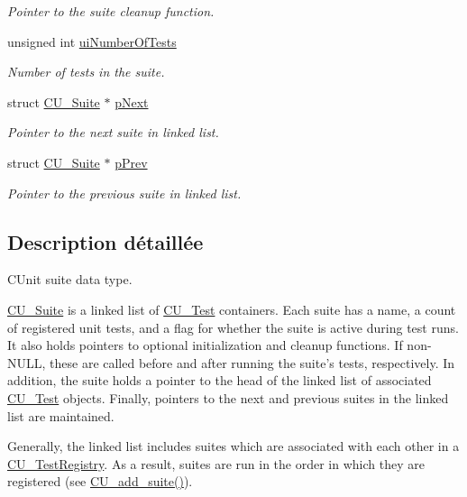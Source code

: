 \begin{DoxyCompactItemize}
\begin{DoxyCompactList}\small\item\em Pointer to the suite cleanup function. \end{DoxyCompactList}\item 
unsigned int \hyperlink{structCU__Suite_ac35747775ea5ffbb4cc1a2eb17dd1ca3}{ui\-Number\-Of\-Tests}
\begin{DoxyCompactList}\small\item\em Number of tests in the suite. \end{DoxyCompactList}\item 
struct \hyperlink{structCU__Suite}{C\-U\-\_\-\-Suite} $\ast$ \hyperlink{structCU__Suite_a695a5eb0087e2d64adc53da4518de69c}{p\-Next}
\begin{DoxyCompactList}\small\item\em Pointer to the next suite in linked list. \end{DoxyCompactList}\item 
struct \hyperlink{structCU__Suite}{C\-U\-\_\-\-Suite} $\ast$ \hyperlink{structCU__Suite_aa161293fb2ba337e52e1f6c9f5d68448}{p\-Prev}
\begin{DoxyCompactList}\small\item\em Pointer to the previous suite in linked list. \end{DoxyCompactList}\end{DoxyCompactItemize}


\subsection{Description détaillée}
C\-Unit suite data type. 

\hyperlink{structCU__Suite}{C\-U\-\_\-\-Suite} is a linked list of \hyperlink{structCU__Test}{C\-U\-\_\-\-Test} containers. Each suite has a name, a count of registered unit tests, and a flag for whether the suite is active during test runs. It also holds pointers to optional initialization and cleanup functions. If non-\/\-N\-U\-L\-L, these are called before and after running the suite's tests, respectively. In addition, the suite holds a pointer to the head of the linked list of associated \hyperlink{structCU__Test}{C\-U\-\_\-\-Test} objects. Finally, pointers to the next and previous suites in the linked list are maintained.\par
\par


Generally, the linked list includes suites which are associated with each other in a \hyperlink{structCU__TestRegistry}{C\-U\-\_\-\-Test\-Registry}. As a result, suites are run in the order in which they are registered (see \hyperlink{group__Framework_ga94b8f1bbbd93b154a60bb1d43391b48a}{C\-U\-\_\-add\-\_\-suite()}).\par
\par


